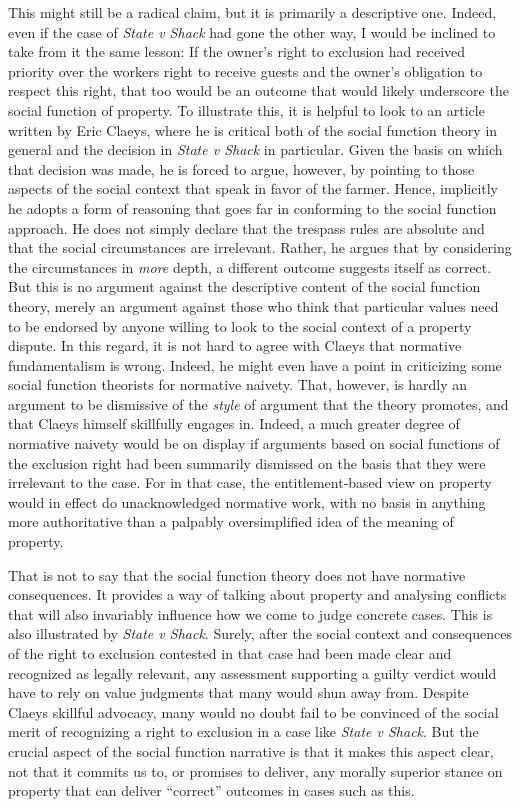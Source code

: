 This might still be a radical claim, but it is primarily a descriptive one. Indeed, even if the case of {\it State v Shack} had gone the other way, I would be inclined to take from it the same lesson: If the owner's right to exclusion had received priority over the workers right to receive guests and the owner's obligation to respect this right, that too would be an outcome that would likely underscore the social function of property. To illustrate this, it is helpful to look to an article written by Eric Claeys, where he is critical both of the social function theory in general and the decision in {\it State v Shack} in particular. Given the basis on which that decision was made, he is forced to argue, however, by pointing to those aspects of the social context that speak in favor of the farmer. Hence, implicitly he adopts a form of reasoning that goes far in conforming to the social function approach. He does not simply declare that the trespass rules are absolute and that the social circumstances are irrelevant. Rather, he argues that by considering the circumstances in {\it more} depth, a different outcome suggests itself as correct. But this is no argument against the descriptive content of the social function theory, merely an argument against those who think that particular values need to be endorsed by anyone willing to look to the social context of a property dispute. In this regard, it is not hard to agree with Claeys that normative fundamentalism is wrong. Indeed, he might even have a point in criticizing some social function theorists for normative naivety. That, however, is hardly an argument to be dismissive of the {\it style} of argument that the theory promotes, and that Claeys himself skillfully engages in. Indeed, a much greater degree of normative naivety would be on display if arguments based on social functions of the exclusion right had been summarily dismissed on the basis that they were irrelevant to the case. For in that case, the entitlement-based view on property would in effect do unacknowledged normative work, with no basis in anything more authoritative than a palpably oversimplified idea of the meaning of property.

That is not to say that the social function theory does not have normative consequences. It provides a way of talking about property and analysing conflicts that will also invariably influence how we come to judge concrete cases. This is also illustrated by {\it State v Shack}. Surely, after the social context and consequences of the right to exclusion contested in that case had been made clear and recognized as legally relevant, any assessment supporting a guilty verdict would have to rely on value judgments that many would  shun away from. Despite Claeys skillful advocacy, many would no doubt fail to be convinced of the social merit of recognizing a right to exclusion in a case like {\it State v Shack}. But the crucial aspect of the social function narrative is that it makes this aspect clear, not that it commits us to, or promises to deliver, any morally superior stance on property that can deliver ``correct'' outcomes in cases such as this.

